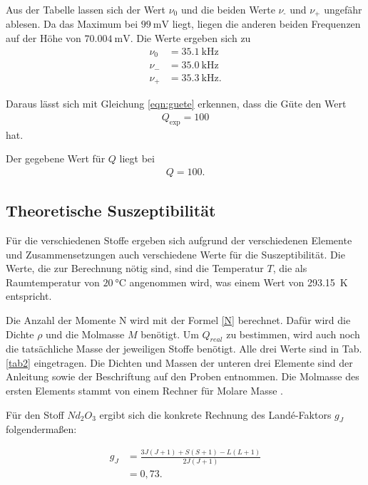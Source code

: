 \noindent Aus der Tabelle lassen sich der Wert $\nu_0$ und die beiden Werte $\nu_\text{-}$ und $\nu_\text{+}$ ungefähr ablesen.
Da das Maximum bei $\SI{99}{\milli\volt}$ liegt, liegen die anderen beiden Frequenzen auf der Höhe von $\SI{70.004}{\milli\volt}$.
Die Werte ergeben sich zu 
\begin{align*} 
 \nu_0 &= \SI{35.1}{\kilo\hertz} \\
 \nu_{-} &= \SI{35.0}{\kilo\hertz} \\
 \nu_{+} &= \SI{35.3}{\kilo\hertz}. 
\end{align*}

\noindent Daraus lässt sich mit Gleichung \eqref{eqn:guete} erkennen, dass die Güte den Wert 
\begin{align*} 
    Q_\text{exp} = \num{100}
\end{align*}
hat. 

\noindent Der gegebene Wert für $Q$ liegt bei 
\begin{align*} 
    Q = \num{100}.
\end{align*}


\subsection{Theoretische Suszeptibilität} 
Für die verschiedenen Stoffe ergeben sich aufgrund der verschiedenen Elemente und Zusammensetzungen auch verschiedene 
Werte für die Suszeptibilität. 
Die Werte, die zur Berechnung nötig sind, sind die Temperatur $T$, die als Raumtemperatur von $\SI{20}{\celsius}$ angenommen wird, was einem Wert von \SI{293.15}{\kelvin} entspricht. 

\noindent Die Anzahl der Momente N wird mit der Formel \eqref{N} berechnet. Dafür wird die Dichte $\rho$ und die Molmasse $M$ benötigt. Um $Q_{real}$ zu bestimmen, wird auch noch die tatsächliche Masse der jeweiligen Stoffe benötigt. Alle drei Werte sind in Tab. \ref{tab2} eingetragen.
Die Dichten und Massen der unteren drei Elemente sind der Anleitung \cite{V606} sowie der Beschriftung auf den Proben entnommen.
Die Molmasse des ersten Elements stammt von einem Rechner für Molare Masse \cite{C6}. %


\noindent Für den Stoff $Nd_2 O_3$ ergibt sich die konkrete Rechnung des Landé-Faktors $g_J$ folgendermaßen: 

\begin{align*}
    g_J &= \frac{3 J (J+1) + S (S+1) - L (L+1)}{2 J (J+1)} \\
        &= 0,73.
\end{align*} 


